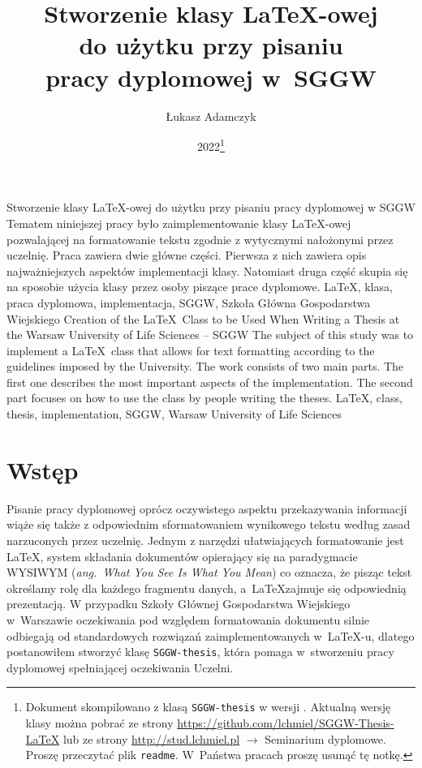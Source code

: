 \documentclass{SGGW-thesis}
\title{Stworzenie klasy \LaTeX-owej\\do użytku przy pisaniu\\pracy dyplomowej w~SGGW}
\author{Łukasz Adamczyk}
\date{2022\footnote{Dokument skompilowano z klasą {\tt SGGW-thesis} w wersji \version. Aktualną wersję klasy można pobrać ze strony \hspace{0.2em}\url{https://github.com/lchmiel/SGGW-Thesis-LaTeX}\hspace{0.2em} lub ze strony \hspace{0.2em}\url{http://stud.lchmiel.pl} $\rightarrow$
Seminarium dyplomowe. Proszę przeczytać plik {\tt readme}. W~Państwa pracach proszę usunąć tę notkę.}}
\begin{document}
\maketitle
\statementpage
\abstractpage
{Stworzenie klasy \LaTeX-owej do użytku przy pisaniu pracy dyplomowej w SGGW}
{Tematem niniejszej pracy było zaimplementowanie klasy \LaTeX-owej pozwalającej na formatowanie tekstu zgodnie z wytycznymi nałożonymi przez uczelnię. Praca zawiera dwie
główne części. Pierwsza z nich zawiera opis najważniejszych aspektów implementacji klasy. Natomiast druga część skupia się na sposobie użycia klasy przez osoby piszące prace
dyplomowe.}
{LaTeX, klasa, praca dyplomowa, implementacja, SGGW, Szkoła Główna Gospodarstwa Wiejskiego}
{Creation of the \LaTeX\ Class to be Used When Writing a Thesis at the Warsaw University of Life Sciences -- SGGW}
{The subject of this study was to implement a \LaTeX\ class that allows for text formatting according to the guidelines imposed by the University. The work consists of two
main parts. The first one describes the most important aspects of the implementation. The second part focuses on how to use the class by people writing the theses.}
{LaTeX, class, thesis, implementation, SGGW, Warsaw University of Life Sciences}


{
  \doublespacing
  \tableofcontents
}

\startchapterfromoddpage %

\chapter{Wstęp}
Pisanie pracy dyplomowej oprócz oczywistego aspektu przekazywania informacji wiąże się także z odpowiednim sformatowaniem wynikowego tekstu według zasad narzuconych przez
uczelnię. Jednym z narzędzi ułatwiających formatowanie jest \LaTeX, system składania dokumentów opierający się na paradygmacie WYSIWYM ({\em ang.\ What You See Is What You
Mean}) co oznacza, że pisząc tekst określamy rolę dla każdego fragmentu danych, a~\LaTeX zajmuje się odpowiednią prezentacją. W przypadku Szkoły Głównej Gospodarstwa
Wiejskiego w~Warszawie oczekiwania pod względem formatowania dokumentu silnie odbiegają od standardowych rozwiązań zaimplementowanych w~\LaTeX-u, dlatego postanowiłem
stworzyć klasę {\tt SGGW-thesis}, która pomaga w~stworzeniu pracy dyplomowej spełniającej oczekiwania Uczelni.
\end{document}
